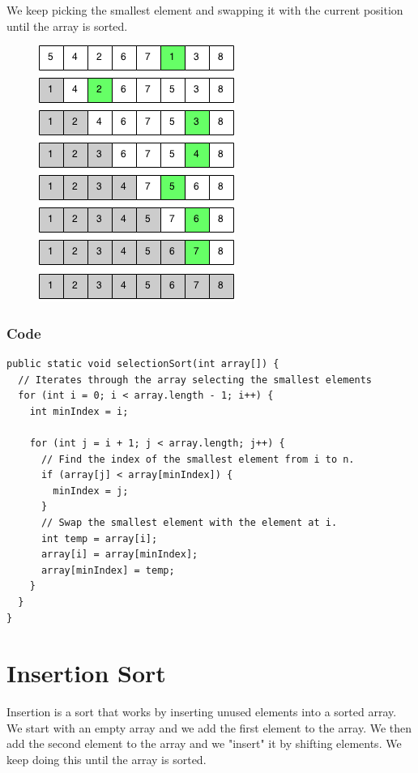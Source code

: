 \documentclass[11pt,oneside]{book}
\makeatletter
\def\maxwidth#1{\ifdim\Gin@nat@width>#1 #1\else\Gin@nat@width\fi}
\makeatother
\begin{document}
We keep picking the smallest element and swapping it with the current position until the array is sorted.

\vspace{5px}\begin{figure}[H]\centering
        \includegraphics[width=0.66\maxwidth{\textwidth}]{selection_sort.png}
        \end{figure}

\subsubsection{Code}

\begin{lstlisting}
public static void selectionSort(int array[]) {
  // Iterates through the array selecting the smallest elements
  for (int i = 0; i < array.length - 1; i++) {
    int minIndex = i;

    for (int j = i + 1; j < array.length; j++) {
      // Find the index of the smallest element from i to n.
      if (array[j] < array[minIndex]) {
        minIndex = j;
      }
      // Swap the smallest element with the element at i.
      int temp = array[i];
      array[i] = array[minIndex];
      array[minIndex] = temp;
    }
  }
}

\end{lstlisting}

        \section{ Insertion Sort }
        

Insertion is a sort that works by inserting unused elements into a sorted array. We start with an empty array and we add the first element to the array. We then add the second element to the array and we "insert" it by shifting elements. We keep doing this until the array is sorted.
\end{document}
